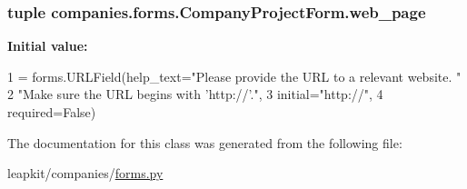 \hypertarget{classcompanies_1_1forms_1_1_company_project_form_a7ea0d7b20777d3b8f59428103e733cdf}{
\subsubsection[{web\-\_\-page}]{\setlength{\rightskip}{0pt plus 5cm}tuple companies.\-forms.\-Company\-Project\-Form.\-web\-\_\-page\hspace{0.3cm}{\ttfamily [static]}}}\label{classcompanies_1_1forms_1_1_company_project_form_a7ea0d7b20777d3b8f59428103e733cdf}
{\bfseries Initial value\-:}
\begin{DoxyCode}
1 = forms.URLField(help\_text=\textcolor{stringliteral}{"Please provide the URL to a relevant website. "}
2                                         \textcolor{stringliteral}{"Make sure the URL begins with 'http://'."},
3                               initial=\textcolor{stringliteral}{"http://"},
4                               required=\textcolor{keyword}{False})
\end{DoxyCode}


The documentation for this class was generated from the following file\-:\begin{DoxyCompactItemize}
\item 
leapkit/companies/\hyperlink{companies_2forms_8py}{forms.\-py}\end{DoxyCompactItemize}

